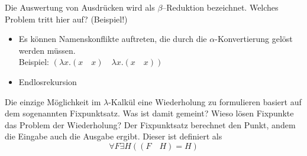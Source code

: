 \begin{card}
  Die Auswertung von Ausdrücken wird als $\beta$–Reduktion bezeichnet. Welches Problem tritt hier auf? (Beispiel!)
  \hr
  \begin{itemize}
    \item Es können Namenskonflikte auftreten, die durch die $\alpha$-Konvertierung gelöst werden müssen.\\
      Beispiel: $(\lambda x.(x \quad x) \quad \lambda x.(x \quad x))$
    \item Endlosrekursion
  \end{itemize}
\end{card}

\begin{card}
  Die einzige Möglichkeit im $\lambda$-Kalkül eine Wiederholung zu formulieren basiert auf dem sogenannten Fixpunktsatz. Was ist damit gemeint? Wieso lösen Fixpunkte das Problem der Wiederholung?
  \hr
  Der Fixpunktsatz berechnet den Punkt, andem die Eingabe auch die Ausgabe ergibt. Dieser ist definiert als
  \[
    \forall F \exists H ((F \quad H) = H)
  \]
\end{card}
